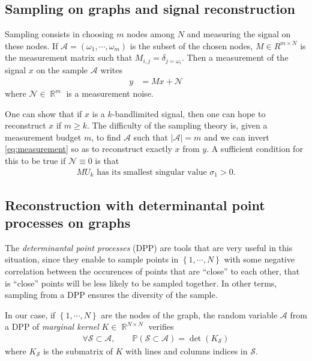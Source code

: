 \documentclass{article}
\newcommand{\abs} [1] {\left| #1 \right|}
\DeclareMathOperator{\R}{\mathbb{R}}
\begin{document}
\subsection{Sampling on graphs and signal reconstruction}


Sampling consists in choosing $m$ nodes among $N$ and measuring the signal on these nodes. If $\mathcal{A} = (\omega_1, \cdots, \omega_m)$ is the subset of the chosen nodes, $M \in R^{m \times N}$ is the measurement matrix such that $M_{i, j} = \delta_{j = \omega_i}$. Then a measurement of the signal $x$ on the sample $\mathcal{A}$ writes
\begin{align} y &= M x + \mathcal{N} \label{eq:measurement}\end{align}
where $\mathcal{N} \in \R^m$ is a measurement noise.


One can show that if $x$ is a $k$-bandlimited signal, then one can hope to reconstruct $x$ if $m \geq k$. The difficulty of the sampling theory is, given a measurement budget $m$, to find $\mathcal{A}$ such that $\abs{\mathcal{A}} = m$ and we can invert \eqref{eq:measurement} so as to reconstruct exactly $x$ from $y$. A sufficient condition for this to be true if $\mathcal{N} \equiv 0$ is that 
\begin{align} \text{$MU_k$ has its smallest singular value $\sigma_1 > 0$.} \label{eq:sufficientconditionreconstruction}\end{align}


\subsection{Reconstruction with determinantal point processes on graphs}


The \emph{determinantal point processes} (DPP) \cite{kuelsza2012} are tools that are very useful in this situation, since they enable to sample points in $\left\{ 1, \cdots, N\right\}$ with some negative correlation between the occurences of points that are ``close'' to each other, that is ``close'' points will be less likely to be sampled together. In other terms, sampling from a DPP ensures the diversity of the sample.


In our case, if $\left\{ 1, \cdots, N\right\}$ are the nodes of the graph, the random variable $\mathcal{A}$ from a DPP of \emph{marginal kernel} $K \in \R^{N \times N}$ verifies
\begin{align} \forall \mathcal{S} \subset \mathcal{A}, \qquad \mathbb{P}(\mathcal{S} \subset \mathcal{A}) = \det(K_\mathcal{S}) \label{eq:defDPP}\end{align}
where $K_\mathcal{S}$ is the submatrix of $K$ with lines and columns indices in $\mathcal{S}$.
\end{document}
